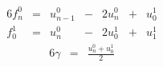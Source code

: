 \begin{alignat}{6}
\label{eq:4.2} f_{n}^0 & {}={} & u_{n-1}^0 & {}-{} & 2u_{n}^0 & {}+{} &  u_{0}^1 \\
\label{eq:4.3} f_{0}^1 & {}={} & u_{n}^0 & {}-{} & 2u_{0}^1 & {}+{} &  u_{1}^1
\end{alignat}
\begin{alignat}{6}
\label{eq:4.4} \gamma & {}={} & \frac{u_{n}^0 + u_{0}^1}{2}
\end{alignat}